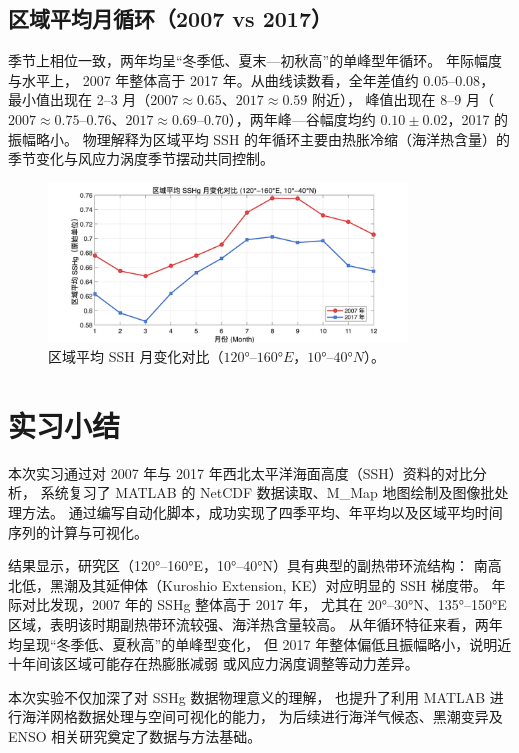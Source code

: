 \documentclass[UTF8]{article}
\begin{document}
\subsection{区域平均月循环（2007 vs 2017）}
季节上相位一致，两年均呈“冬季低、夏末—初秋高”的单峰型年循环。
年际幅度与水平上，
2007 年整体高于 2017 年。从曲线读数看，全年差值约 $0.05–0.08$，
最小值出现在 2–3 月（$2007 \approx 0.65$、$2017 \approx 0.59$ 附近），
峰值出现在 8–9 月（$2007 \approx 0.75–0.76、2017 \approx 0.69–0.70$），两年峰—谷幅度均约 $0.10±0.02$，2017 的振幅略小。
物理解释为区域平均 SSH 的年循环主要由热胀冷缩（海洋热含量）的季节变化与风应力涡度季节摆动共同控制。
\begin{figure}[H]
    \centering
    \includegraphics[width=0.85\textwidth]{SSHg_RegionalMean_TS_2007vs2017.png}
    \caption{区域平均 SSH 月变化对比（$120°–160°E，10°–40°N$）。}
    \label{fig:SSH_ts}
\end{figure}





\section{实习小结}
本次实习通过对 2007 年与 2017 年西北太平洋海面高度（SSH）资料的对比分析，
系统复习了 MATLAB 的 NetCDF 数据读取、M\_Map 地图绘制及图像批处理方法。
通过编写自动化脚本，成功实现了四季平均、年平均以及区域平均时间序列的计算与可视化。

结果显示，研究区（120°–160°E，10°–40°N）具有典型的副热带环流结构：
南高北低，黑潮及其延伸体（Kuroshio Extension, KE）对应明显的 SSH 梯度带。
年际对比发现，2007 年的 SSHg 整体高于 2017 年，
尤其在 20°–30°N、135°–150°E 区域，表明该时期副热带环流较强、海洋热含量较高。
从年循环特征来看，两年均呈现“冬季低、夏秋高”的单峰型变化，
但 2017 年整体偏低且振幅略小，说明近十年间该区域可能存在热膨胀减弱
或风应力涡度调整等动力差异。

本次实验不仅加深了对 SSHg 数据物理意义的理解，
也提升了利用 MATLAB 进行海洋网格数据处理与空间可视化的能力，
为后续进行海洋气候态、黑潮变异及 ENSO 相关研究奠定了数据与方法基础。
\end{document}
